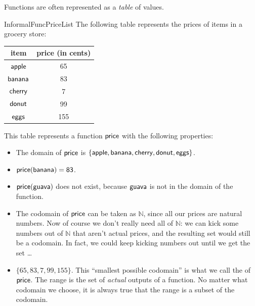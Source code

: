 Functions are often represented as a \emph{table} of values. 

\begin{example}{InformalFuncPriceList}
The following table represents the prices of items in a grocery store:

\begin{center}
\begin{tabular}{c|c}
item & price (in cents) \\
\hline
$\sf{apple}$ & 65 \\
$\sf{banana}$ & 83 \\
$\sf{cherry}$ & 7 \\
$\sf{donut}$ & 99 \\
$\sf{eggs}$ & 155 \\
\end{tabular}
\end{center}
This table represents a function $\sf{price}$ with the following properties:
\begin{itemize}
\item The domain of $\sf{price}$ is
 $\{ \sf{apple} , \sf{banana} , \sf{cherry} , \sf{donut} , \sf{eggs}\}$.
\item $\sf{price}(\sf{banana}) = 83$.
\item $\sf{price}(\sf{guava})$ does not exist, because $\sf{guava}$ is not in the domain of the function.
\item The codomain of $\sf{price}$ can be taken as $\mathbb{N}$, since all our prices are natural numbers.  Now of course we don't really need all of $\mathbb{N}$: we can kick some numbers out of $\mathbb{N}$ that aren't actual prices, and the resulting set would still be a codomain.  In fact, we could keep kicking numbers out until we get the set \ldots
\item
$\{ 65, 83, 7, 99, 155 \}$. This ``smallest possible codomain'' is what we call the  of $\sf{price}$.  The range is the set of \emph{actual} outputs of a function. No matter what codomain we choose, it is always true that the range is a subset of the codomain.
\end{itemize}
\end{example}

